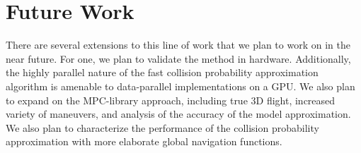 \documentclass{llncs}
\begin{document}
\section{Future Work}


There are several extensions to this line of work that we plan to work on in the near future.  For one, we plan to validate the method in hardware.  Additionally, the highly parallel nature of the fast collision probability approximation algorithm is amenable to data-parallel implementations on a GPU.  We also plan to expand on the MPC-library approach, including true 3D flight, increased variety of maneuvers, and analysis of the accuracy of the model approximation.  We also plan to characterize the performance of the collision probability approximation with more elaborate global navigation functions.
\end{document}
